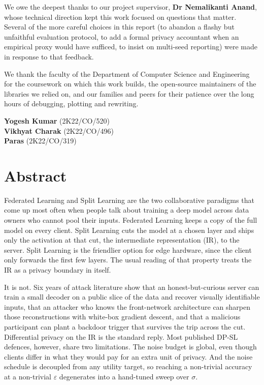 \documentclass[11pt,a4paper,oneside]{report}
\begin{document}
We owe the deepest thanks to our project supervisor,
\textbf{Dr Nemalikanti Anand}, whose technical direction kept this work
focused on questions that matter. Several of the more careful choices
in this report (to abandon a flashy but unfaithful evaluation
protocol, to add a formal privacy accountant when an empirical proxy
would have sufficed, to insist on multi-seed reporting) were made in
response to that feedback.

We thank the faculty of the Department of Computer Science and
Engineering for the coursework on which this work builds, the
open-source maintainers of the libraries we relied on, and our
families and peers for their patience over the long hours of
debugging, plotting and rewriting.

\vspace{2em}
\noindent
\textbf{Yogesh Kumar} (2K22/CO/520)\\
\textbf{Vikhyat Charak} (2K22/CO/496)\\
\textbf{Paras} (2K22/CO/319)

\clearpage

\chapter*{Abstract}

Federated Learning and Split Learning are the two collaborative
paradigms that come up most often when people talk about training a
deep model across data owners who cannot pool their inputs.
Federated Learning keeps a copy of the full model on every client.
Split Learning cuts the model at a chosen layer and ships only the
activation at that cut, the intermediate representation (IR), to the
server. Split Learning is the friendlier option for edge hardware,
since the client only forwards the first few layers. The usual reading
of that property treats the IR as a privacy boundary in itself.

It is not. Six years of attack literature show that an
honest-but-curious server can train a small decoder on a public slice
of the data and recover visually identifiable inputs, that an attacker
who knows the front-network architecture can sharpen those
reconstructions with white-box gradient descent, and that a malicious
participant can plant a backdoor trigger that survives the trip across
the cut. Differential privacy on the IR is the standard reply. Most
published DP-SL defences, however, share two limitations. The noise
budget is global, even though clients differ in what they would pay
for an extra unit of privacy. And the noise schedule is decoupled
from any utility target, so reaching a non-trivial accuracy at a
non-trivial $\varepsilon$ degenerates into a hand-tuned sweep over
$\sigma$.
\end{document}

